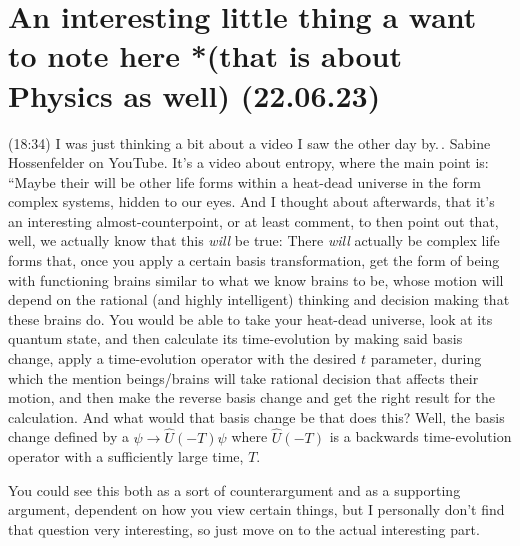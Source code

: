 \documentclass{report}
\begin{document}
\section{An interesting little thing a want to note here *(that is about Physics as well) (22.06.23)}
(18:34) I was just thinking a bit about a video I saw the other day by.\,. 
Sabine Hossenfelder on YouTube. It's a video about entropy, where the main point is: ``Maybe their will be other life forms within a heat-dead universe in the form complex systems, hidden to our eyes. And I thought about afterwards, that it's an interesting almost-counterpoint, or at least comment, to then point out that, well, we actually know that this \emph{will} be true: There \emph{will} actually be complex life forms that, once you apply a certain basis transformation, get the form of being with functioning brains similar to what we know brains to be, whose motion will depend on the rational (and highly intelligent) thinking and decision making that these brains do. You would be able to take your heat-dead universe, look at its quantum state, and then calculate its time-evolution by making said basis change, apply a time-evolution operator with the desired $t$ parameter, during which the mention beings/brains will take rational decision that affects their motion, and then make the reverse basis change and get the right result for the calculation. And what would that basis change be that does this? Well, the basis change defined by a $\psi \to \hat U (-T)\psi$ where $\hat U (-T)$ is a backwards time-evolution operator with a sufficiently large time, $T$.

You could see this both as a sort of counterargument and as a supporting argument, dependent on how you view certain things, but I personally don't find that question very interesting, so just move on to the actual interesting part.
\end{document}
